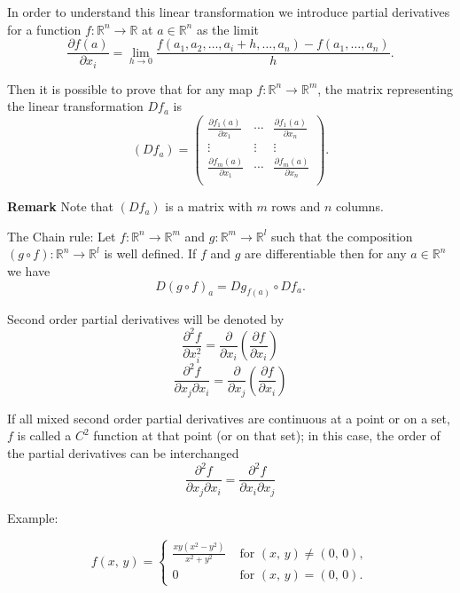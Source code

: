 \documentclass{amsart}
\begin{document}
In order to understand this linear transformation we introduce partial derivatives for a function \(f: \mathbb{R}^n \to \mathbb{R}\) at \(a \in \mathbb{R}^n\) as the limit
\[ \frac{\partial f(a)}{\partial x_i} = \lim_{h\to 0} \frac{f(a_1,a_2,\ldots, a_i + h, \ldots, a_n) - f(a_1,\ldots, a_n)}{h}.\]

Then it is possible to prove that for any map \(f:\mathbb{R}^n \to \mathbb{R}^m\), the matrix representing the linear transformation \(Df_a\) is 
\[ (Df_a) = \left( \begin{array}{ccc}
\frac{\partial f_1(a)}{\partial x_1} & \cdots & \frac{\partial f_1(a)}{\partial x_n}\\
\vdots & \vdots & \vdots  \\
\frac{\partial f_m(a)}{\partial x_1} & \cdots & \frac{\partial f_m(a)}{\partial x_n}\\
\end{array} \right). \]

\textbf{Remark} Note that \((Df_a)\)  is a matrix with \(m\) rows and \(n\) columns.



The Chain rule: Let \(f:\mathbb{R}^n \to \mathbb{R}^m\) and \(g: \mathbb{R}^m \to \mathbb{R}^l\) such that the composition 
\((g\circ f) : \mathbb{R}^n \to \mathbb{R}^l\) is well defined. If \(f\) and \(g\) are differentiable then for any \(a\in \mathbb{R}^n\) we have
\[D(g\circ f)_a = Dg_{f(a)} \circ Df_a. \] 

Second order partial derivatives will be denoted by
\[\frac{ \partial^2 f}{\partial x_i^2} = \frac{\partial}{\partial x_i}\left( \frac{\partial f}{\partial x_i}\right) \]
\[\frac{ \partial^2 f}{\partial x_j \partial x_i} = \frac{\partial}{\partial x_j}\left( \frac{\partial f}{\partial x_i}\right) \]

If all mixed second order partial derivatives are continuous at a point or on a set, \(f\) is called a \(C^2\) function at that point (or on that set); in this case, the order of the partial derivatives can be interchanged
\[ \frac{\partial^2 f}{\partial x_j \partial x_i} = \frac{\partial^2 f}{\partial x_i \partial x_j}\]

Example:

\[{\displaystyle f(x,\,y)={\begin{cases}{\frac {xy\left(x^{2}-y^{2}\right)}{x^{2}+y^{2}}}&{\mbox{ for }}(x,\,y)\neq (0,\,0),\\0&{\mbox{ for }}(x,\,y)=(0,\,0).\end{cases}}}\]
\end{document}
